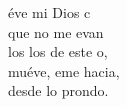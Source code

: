 \begin{cancion}%
	éve mi Dios c \\
	que no me evan \\
	los los de este o,\\
	muéve, eme hacia, \\
	desde lo prondo.\\
\end{cancion}%
